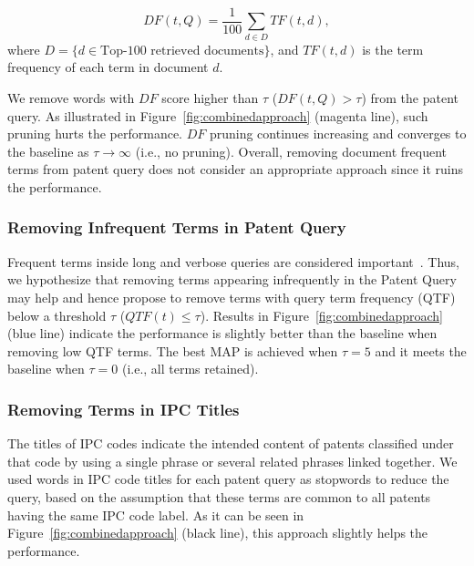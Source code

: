 \begin{equation}
 DF(t, Q)=\frac{1}{100}\sum_{d\in  D} TF(t, d),    
 \label{eq:df}
\end{equation}
where $D=\{d\in \mbox{Top-100 retrieved documents}\}$, and $TF(t, d)$ is the term frequency of each term in document $d$.

We remove words with $\mathit{DF}$ score higher than $\tau$ ($DF(t, Q)>\tau$) from the patent query. 
As illustrated in Figure~\ref{fig:combinedapproach} (magenta line), such pruning hurts the performance. $\mathit{DF}$ pruning continues increasing and converges to the baseline as $\tau \to \infty $ (i.e., no pruning).
Overall, removing document frequent terms from patent query does not consider an appropriate approach since it ruins the performance. 
\subsubsection{Removing Infrequent Terms in Patent Query}
Frequent terms inside long and verbose queries are considered important~\cite{maxwell2013compact}. Thus, we hypothesize that removing terms appearing infrequently in the Patent Query may help and hence propose to remove terms with query term frequency (QTF) below a threshold $\tau$ ($QTF(t) \leq \tau$). Results in Figure~\ref{fig:combinedapproach} (blue line) indicate the performance is slightly better than the baseline when removing low QTF terms.  The best MAP is achieved when $\tau=5$ and it meets the baseline when $\tau=0$ (i.e., all terms retained). 
\subsubsection{Removing Terms in IPC Titles}
The titles of IPC codes indicate the intended content of patents classified under that code by using a single phrase or several related phrases linked together. We used words in IPC code titles for each patent query as stopwords to reduce the query, based on the assumption that these terms are common to all patents having the same IPC code label.  As it can be seen in Figure~\ref{fig:combinedapproach} (black line), this approach slightly helps the performance.
